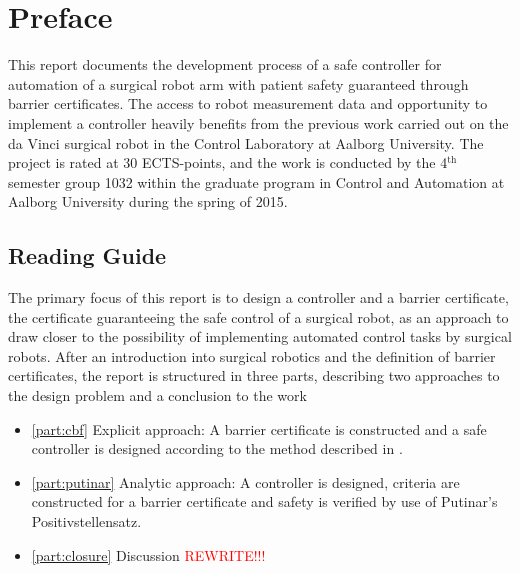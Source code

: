 \chapter*{Preface}
\vspace*{-2mm}
This report documents the development process of a safe controller for automation of a surgical robot arm with patient safety guaranteed through barrier certificates. %
The access to robot measurement data and opportunity to implement a controller heavily benefits from the previous work carried out on the da Vinci surgical robot in the Control Laboratory at Aalborg University.
The project is rated at 30 ECTS-points, and the work is conducted by the 4$^\text{th}$ semester group 1032 within the graduate program in Control and Automation at Aalborg University during the spring of 2015.



\vspace*{-2mm}
\section*{Reading Guide}
\vspace*{-2mm}
The primary focus of this report is to design a controller and a barrier certificate, the certificate guaranteeing the safe control of a surgical robot, as an approach to draw closer to the possibility of implementing automated control tasks by surgical robots. 
After an introduction into surgical robotics and the definition of barrier certificates, the report is structured in three parts, describing two approaches to the design problem and a conclusion to the work
\vspace*{-3mm}
\begin{itemize}
\itemsep-1.4mm
\item \autoref{part:cbf} Explicit approach: A barrier certificate is constructed and a safe controller is designed according to the method described in \citep{bib:org_control}.
\item \autoref{part:putinar} Analytic approach: A controller is designed, criteria are constructed for a barrier certificate and  safety is verified by use of Putinar's Positivstellensatz.
\item \autoref{part:closure} Discussion \textcolor{red}{REWRITE!!!}
\end{itemize}
\vspace*{-2mm}

